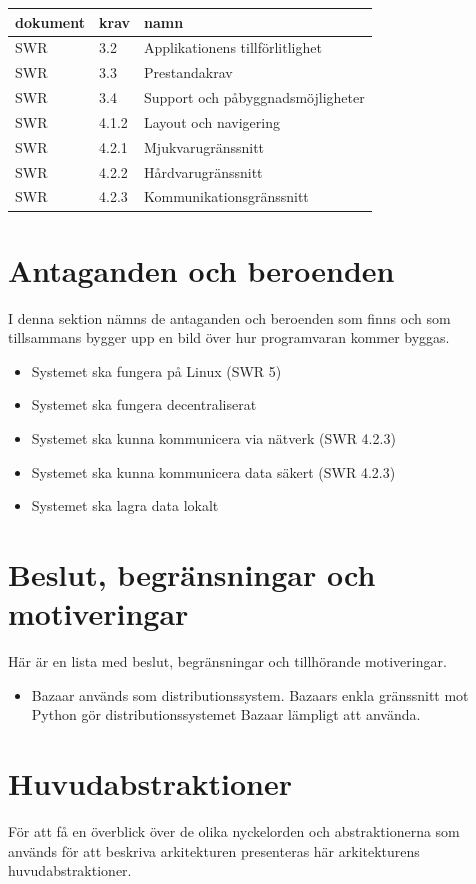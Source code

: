 \vspace{10pt}
\begin{tabularx}{\textwidth}{ |l|l|X| }
  \hline
    \textbf{dokument} & \textbf{krav} & \textbf{namn} \\
    \hline
    SWR & 3.2 & Applikationens tillförlitlighet \\
    SWR & 3.3 & Prestandakrav \\
    SWR & 3.4 & Support och påbyggnadsmöjligheter \\
    SWR & 4.1.2 & Layout och navigering \\
    SWR & 4.2.1 & Mjukvarugränssnitt \\
    SWR & 4.2.2 & Hårdvarugränssnitt \\
    SWR & 4.2.3 & Kommunikationsgränssnitt \\
    \hline
\end{tabularx}

\section{Antaganden och beroenden}
I denna sektion nämns de antaganden och beroenden som finns och som tillsammans bygger upp en bild över hur programvaran kommer byggas.
\begin{itemize}
\item Systemet ska fungera på Linux (SWR 5)
\item Systemet ska fungera decentraliserat
\item Systemet ska kunna kommunicera via nätverk (SWR 4.2.3)
\item Systemet ska kunna kommunicera data säkert (SWR 4.2.3)
\item Systemet ska lagra data lokalt
\end{itemize}
\section{Beslut, begränsningar och motiveringar}
Här är en lista med beslut, begränsningar och tillhörande motiveringar.
\begin{itemize}
\item Bazaar används som distributionssystem. Bazaars enkla gränssnitt mot Python gör distributionssystemet Bazaar lämpligt att använda.
\end{itemize}
\section{Huvudabstraktioner}
För att få en överblick över de olika nyckelorden och abstraktionerna som används för att beskriva arkitekturen presenteras här arkitekturens huvudabstraktioner.
